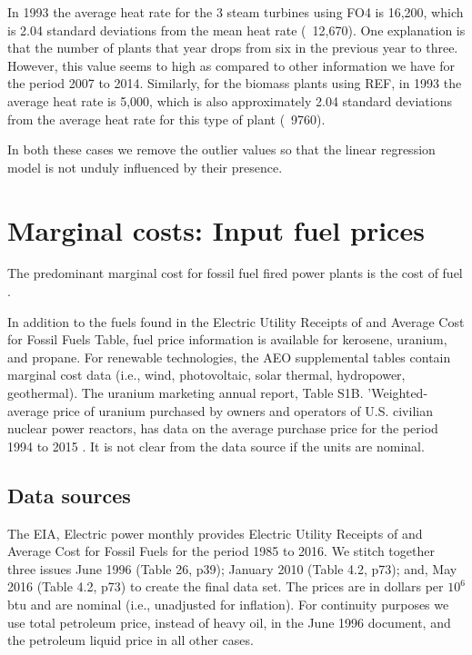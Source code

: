 \documentclass[10pt]{report}
\begin{document}
In 1993 the average heat rate for the 3 steam turbines using FO4 is 16,200, which is 2.04 standard deviations from the mean heat rate (~12,670). One explanation is that the number of plants that year drops from six in the previous year to three. However, this value seems to high as compared to other information we have for the period 2007 to 2014. Similarly, for the biomass plants using REF, in 1993 the average heat rate is 5,000, which is also approximately 2.04 standard deviations from the average heat rate for this type of plant (~9760). 

In both these cases we remove the outlier values so that the linear regression model is not unduly influenced by their presence. 

\chapter{Marginal costs: Input fuel prices}\label{ch_fuelcost}
The predominant marginal cost for fossil fuel fired power plants is the cost of fuel \parencite{}. 

In addition to the fuels found in the Electric Utility Receipts of and Average Cost for Fossil Fuels Table, fuel price information is available for kerosene, uranium, and propane.
For renewable technologies, the AEO supplemental tables contain marginal cost data (i.e., wind, photovoltaic, solar thermal, hydropower, geothermal).
The uranium marketing annual report, Table S1B. 'Weighted-average price of uranium purchased by owners and operators of U.S. civilian nuclear power reactors, has data on the average purchase price for the period 1994 to 2015 \parencite{eiauranium2016}. 
It is not clear from the data source if the units are nominal. 

\section{Data sources}
The EIA, Electric power monthly provides Electric Utility Receipts of and Average Cost for Fossil Fuels for the period 1985 to 2016.
We stitch together three issues June 1996 (Table 26, p39); January 2010 (Table 4.2, p73); and, 
May 2016 (Table 4.2, p73) to create the final data set.
The prices are in dollars per $10^6$ btu and are nominal (i.e., unadjusted for inflation).
For continuity purposes we use total petroleum price, instead of heavy oil, in the June 1996 document, and the petroleum liquid price in all other cases.
\end{document}
